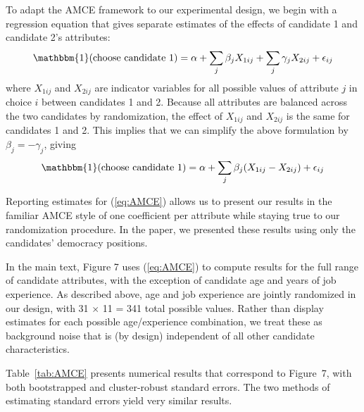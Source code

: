 \documentclass[12pt]{article}
\begin{document}
To adapt the AMCE framework to our experimental design, we begin with a regression equation that gives separate estimates of the effects of candidate 1 and candidate 2's attributes:
\begin{align}
\mathbbm{1}(\text{choose candidate } 1) = \alpha + \sum_j \beta_j X_{1ij} + \sum_j \gamma_j X_{2ij} + \epsilon_{ij} \label{eq:trueAMCE}
\end{align}
where $X_{1ij}$ and $X_{2ij}$ are indicator variables for all possible values of attribute $j$ in choice $i$ between candidates 1 and 2. Because all attributes are balanced across the two candidates by randomization, the effect of $X_{1ij}$ and $X_{2ij}$ is the same for candidates 1 and 2. This implies that we can simplify the above formulation by $\beta_j=-\gamma_j$, giving
\begin{align}
\mathbbm{1}(\text{choose candidate } 1) = \alpha + \sum_j \beta_j (X_{1ij} - X_{2ij}) + \epsilon_{ij} \label{eq:AMCE}
\end{align}

Reporting estimates for (\ref{eq:AMCE}) allows us to present our results in the familiar AMCE style of one coefficient per attribute while staying true to our randomization procedure. In the paper, we presented these results using only the candidates' democracy positions.

In the main text, Figure 7 uses (\ref{eq:AMCE}) to compute results for the full range of candidate attributes, with the exception of candidate age and years of job experience. As described above, age and job experience are jointly randomized in our design, with 31 $\times$ 11 = 341 total possible values. Rather than display estimates for each possible age/experience combination, we treat these as background noise that is (by design) independent of all other candidate characteristics.

Table~\ref{tab:AMCE} presents numerical results that correspond to Figure~7, with both bootstrapped and cluster-robust standard errors. The two methods of estimating standard errors yield very similar results.
\end{document}
